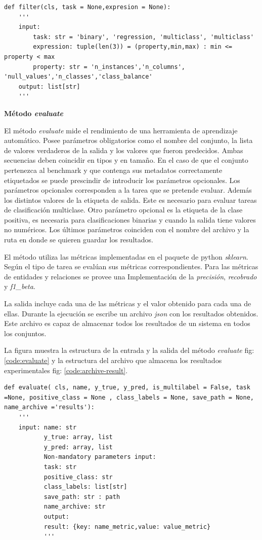 \begin{lstlisting}[caption=Método filter, label= code:filter]
def filter(cls, task = None,expresion = None):
    '''
    input:
        task: str = 'binary', 'regression, 'multiclass', 'multiclass'
        expression: tuple(len(3)) = (property,min,max) : min <= property < max
        property: str = 'n_instances','n_columns', 'null_values','n_classes','class_balance'
    output: list[str]
    '''  
\end{lstlisting}

\begin{flushleft} 
    { \textbf{Método \textit{evaluate}}}\label{method:mevaluate}
\end{flushleft}
El método \textit{evaluate} mide el rendimiento de una herramienta de aprendizaje automático. 
Posee parámetros obligatorios como el nombre del conjunto, la lista de valores verdaderos de la salida y los valores que fueron predecidos.
Ambas secuencias deben coincidir en tipos y en tamaño. En el caso de que el conjunto pertenezca al benchmark y que contenga sus metadatos 
correctamente etiquetados se puede prescindir de introducir los parámetros opcionales. 
Los parámetros opcionales corresponden a la tarea que se pretende evaluar. Además los distintos valores de la etiqueta de salida. Este es necesario para evaluar 
tareas de clasificación multiclase. Otro parámetro opcional es la etiqueta de la clase positiva, es necesaria para clasificaciones binarias y cuando la salida tiene 
valores no numéricos. 
Los últimos parámetros coinciden con el nombre del archivo y la ruta en donde se quieren guardar los resultados. 

El método utiliza las métricas implementadas en el paquete de python \textit{sklearn}. Según el tipo de tarea se evalúan sus métricas correspondientes.
Para las métricas de entidades y relaciones se provee una Implementación de la \textit{precisión}, \textit{recobrado} y \textit{f1\_beta}. 

La salida incluye cada una de las métricas y el valor obtenido para cada una de ellas. Durante la ejecución se escribe un archivo \textit{json} con los resultados 
obtenidos. Este archivo es capaz de almacenar todos los resultados de un sistema en todos los conjuntos.

La figura muestra la estructura de la entrada y la salida del método \textit{evaluate} fig:\ref{code:evaluate} y la estructura del archivo que almacena los resultados 
experimentales fig: \ref{code:archive-result}.


\begin{lstlisting}[caption=Método evaluate, label= code:evaluate]
    def evaluate( cls, name, y_true, y_pred, is_multilabel = False, task =None, positive_class = None , class_labels = None, save_path = None, name_archive ='results'):
    '''
    input: name: str
           y_true: array, list
           y_pred: array, list
           Non-mandatory parameters input:
           task: str
           positive_class: str
           class_labels: list[str]
           save_path: str : path
           name_archive: str
           output: 
           result: {key: name_metric,value: value_metric}
           '''
        \end{lstlisting}
        
